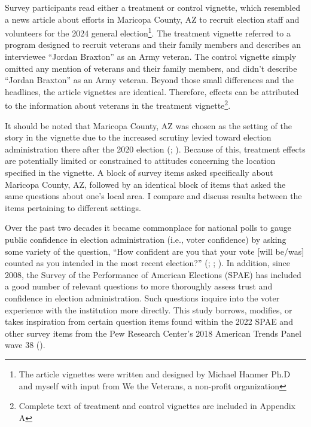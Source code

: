 \documentclass[
  12pt,
  letterpaper,
]{article}
\begin{document}
Survey participants read either a treatment or control vignette, which
resembled a news article about efforts in Maricopa County, AZ to recruit
election staff and volunteers for the 2024 general election\footnote{The
  article vignettes were written and designed by Michael Hanmer Ph.D and
  myself with input from We the Veterans, a non-profit organization}.
The treatment vignette referred to a program designed to recruit
veterans and their family members and describes an interviewee ``Jordan
Braxton'' as an Army veteran. The control vignette simply omitted any
mention of veterans and their family members, and didn't describe
``Jordan Braxton'' as an Army veteran. Beyond those small differences
and the headlines, the article vignettes are identical. Therefore,
effects can be attributed to the information about veterans in the
treatment vignette\footnote{Complete text of treatment and control
  vignettes are included in Appendix A}.

It should be noted that Maricopa County, AZ was chosen as the setting of
the story in the vignette due to the increased scrutiny levied toward
election administration there after the 2020 election
(;
). Because of this, treatment effects are
potentially limited or constrained to attitudes concerning the location
specified in the vignette. A block of survey items asked specifically
about Maricopa County, AZ, followed by an identical block of items that
asked the same questions about one's local area. I compare and discuss
results between the items pertaining to different settings.

Over the past two decades it became commonplace for national polls to
gauge public confidence in election administration (i.e., voter
confidence) by asking some variety of the question, ``How confident are
you that your vote {[}will be/was{]} counted as you intended in the most
recent election?'' (; ;
). In addition, since 2008, the
Survey of the Performance of American Elections (SPAE) has included a
good number of relevant questions to more thoroughly assess trust and
confidence in election administration. Such questions inquire into the
voter experience with the institution more directly. This study borrows,
modifies, or takes inspiration from certain question items found within
the 2022 SPAE and other survey items from the Pew Research Center's 2018
American Trends Panel wave 38 ().
\end{document}
